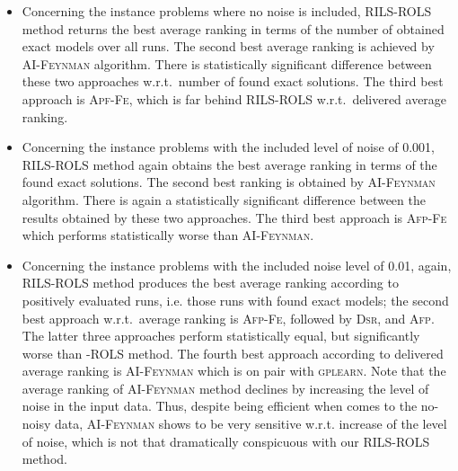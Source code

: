 \documentclass{bmcart}
\begin{document}
\begin{itemize}
	\item  Concerning the instance problems where no noise is included, \textsc{RILS}-\textsc{ROLS} method returns the best average ranking in terms of the number of obtained exact models over all runs.  The second best average ranking is achieved by \textsc{AI-Feynman} algorithm. There is  statistically significant difference between these two approaches w.r.t.\ number of found exact solutions. The third best approach is \textsc{Apf-Fe},  which is far behind \textsc{RILS}-\textsc{ROLS} w.r.t.\ delivered average ranking.  
	\item    Concerning the instance problems with the included  level of noise of 0.001, \textsc{RILS}-\textsc{ROLS} method again obtains the best average ranking in terms of the found exact solutions.   The second best ranking is obtained by \textsc{AI-Feynman} algorithm. There is again a statistically significant difference between the results obtained by these two approaches. The third best approach is \textsc{Afp-Fe} which performs statistically worse than \textsc{AI-Feynman}.  
	\item  Concerning the instance problems with the included noise level of  0.01, again, \textsc{RILS-ROLS} method produces the best average ranking according to positively evaluated runs, i.e. those runs with found  exact models; the second best approach w.r.t.\ average ranking is \textsc{Afp-Fe}, followed by \textsc{Dsr}, and \textsc{Afp}. The  latter three approaches perform statistically equal, but significantly worse than -\textsc{ROLS} method. 	The fourth best approach according to delivered average ranking is \textsc{AI-Feynman} which is on pair with \textsc{gplearn}. Note that the average ranking of \textsc{AI-Feynman} method declines by increasing  the level of noise in the input data. Thus, despite being efficient when comes to the no-noisy data,  \textsc{AI-Feynman} shows to be very sensitive w.r.t.  increase of the level of noise, which is not that dramatically conspicuous with our \textsc{RILS}-\textsc{ROLS} method.   
	
\end{itemize}
\end{document}
